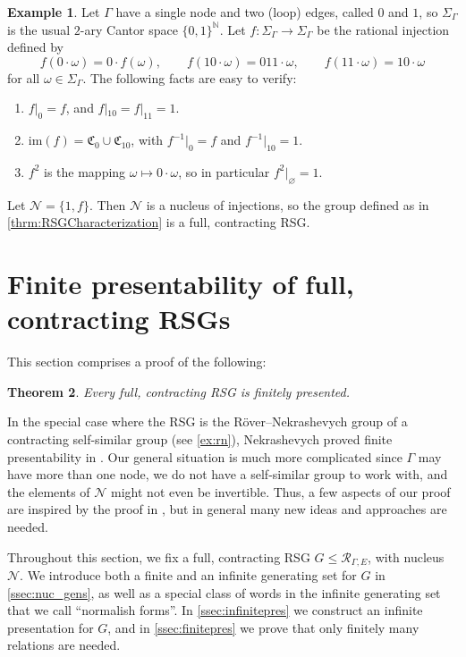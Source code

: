 \documentclass[11pt,letterpaper]{amsart}
\newtheorem{theorem}{Theorem}[section]
\theoremstyle{definition}
\newtheorem{example}[theorem]{Example}
\newcommand{\N}{\mathbb{N}}
\newcommand{\R}{\mathcal{R}}
\newcommand{\Nuc}{\mathcal{N}}
\newcommand{\C}{\mathfrak{C}}
\begin{document}
\begin{example}
Let $\Gamma$ have a single node and two (loop) edges, called $0$ and $1$, so $\Sigma_\Gamma$ is the usual $2$-ary Cantor space $\{0,1\}^\N$. Let $f\colon \Sigma_\Gamma\to \Sigma_\Gamma$ be the rational injection defined by
\[
f(0\cdot\omega) = 0\cdot f(\omega),\qquad f(10\cdot\omega) = 011\cdot\omega,\qquad f(11\cdot\omega)=10\cdot\omega
\]
for all $\omega\in \Sigma_\Gamma$.  The following facts are easy to verify:
\begin{enumerate}
    \item $f|_0=f$, and $f|_{10}=f|_{11}=1$.\smallskip
    \item $\mathrm{im}(f) = \C_0 \cup \C_{10}$, with $f^{-1}|_0 = f$ and $f^{-1}|_{10} = 1$. \smallskip
    \item $f^2$ is the mapping $\omega\mapsto 0\cdot\omega$, so in particular $f^2|_\varnothing=1$.
\end{enumerate}
Let $\Nuc=\{1,f\}$. Then $\Nuc$ is a nucleus of injections, so the group defined as in \cref{thrm:RSGCharacterization} is a full, contracting RSG.
\end{example}




\section{Finite presentability of full, contracting RSGs}\label{sec:fp}

This section comprises a proof of the following:

\begin{theorem}\label{thrm:fin_pres}
Every full, contracting RSG is finitely presented.
\end{theorem}

In the special case where the RSG is the R\"over--Nekrashevych group of a contracting self-similar group (see \cref{ex:rn}), Nekrashevych proved finite presentability in \cite{NekraFP}. Our general situation is much more complicated since $\Gamma$ may have more than one node, we do not have a self-similar group to work with, and the elements of $\Nuc$ might not even be invertible. Thus, a few aspects of our proof are inspired by the proof in \cite{NekraFP}, but in general many new ideas and approaches are needed.

Throughout this section, we fix a full, contracting RSG $G\le \R_{\Gamma,E}$, with nucleus $\Nuc$.  We introduce both a finite and an infinite generating set for $G$ in \cref{ssec:nuc_gens}, as well as a special class of words in the infinite generating set that we call ``normalish forms''.  In \cref{ssec:infinitepres} we construct an infinite presentation for $G$, and in \cref{ssec:finitepres} we prove that only finitely many relations are needed.
\end{document}
